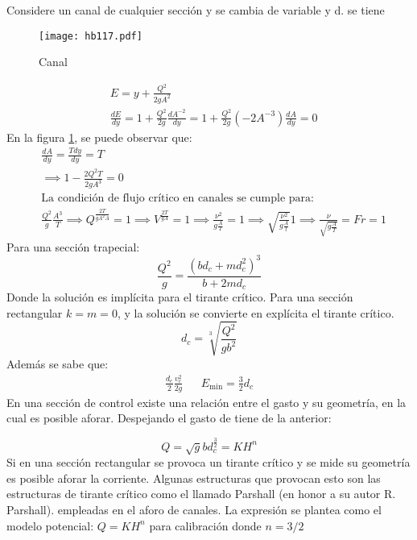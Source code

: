 Considere un canal de cualquier sección y se cambia de variable y d. se tiene

\begin{figure}[h!]
\centering
  \texttt{[image: hb117.pdf]}
  \caption{Canal}
  \label{hb117}
\end{figure}
\begin{align*}
    &E = y + \frac{Q^2}{2gA^2}\\
    &\frac{dE}{dy} = 1 +\frac{Q^2}{2g}\frac{dA^{ -2}}{dy} = 1 + \frac{Q^2}{2g}\left( - 2A^{ - 3}\right)\frac{dA}{dy} = 0
\end{align*}
En la figura \ref{hb117}, se puede observar que:
\begin{align*}
    &\frac{dA}{dy} = \frac{Tdy}{dy} = T\\
    &\implies 1 - \frac{2Q^2T}{2gA^3} = 0\\
    &\text{La condición de flujo crítico en canales se cumple para:}\\
    &\frac{Q^2}{g} \frac{A^3}{T}\implies Q^\frac{2T}{gA^2A} = 1\implies V^\frac{2T}{gA} =1\implies \frac{\nu^2}{g \frac{A}{T}} = 1\implies \sqrt{\frac{\nu^2}{g \frac{A}{t}}} 1\implies \frac{\nu}{\sqrt{g \frac{A}{T}}} = Fr = 1
\end{align*}
Para una sección trapecial:
\begin{equation}
    \frac{Q^2}{g} =\frac{\left(bd_c + md_c^2\right)^3}{b + 2md_c}
\end{equation}
Donde la solución es implícita para el tirante crítico. Para una sección rectangular $k=m=0$, y la solución se convierte en explícita el tirante crítico.
\begin{equation}
    d_c = \sqrt[3]{\frac{Q^2}{gb^2}}
\end{equation}
Además se sabe que:
\begin{align*}
    \frac{d_c}{2} \frac{v_c^2}{2g}&& E_{\min} = \frac{3}{2}d_c
\end{align*}
En una sección de control existe una relación entre el gasto y su geometría, en la cual es posible aforar. Despejando el gasto de tiene de la anterior:

\begin{equation}
    Q = \sqrt{g}bd_c^{\frac{3}{2}} = KH^n
\end{equation}
Si en una sección rectangular se provoca un tirante crítico y se mide su geometría es posible aforar la corriente. Algunas estructuras que provocan esto son las estructuras de tirante crítico como el llamado Parshall (en honor a su autor R. Parshall). empleadas en el aforo de canales. La expresión se plantea como el modelo potencial: $Q=KH^n$ para calibración donde $n= 3/2$

